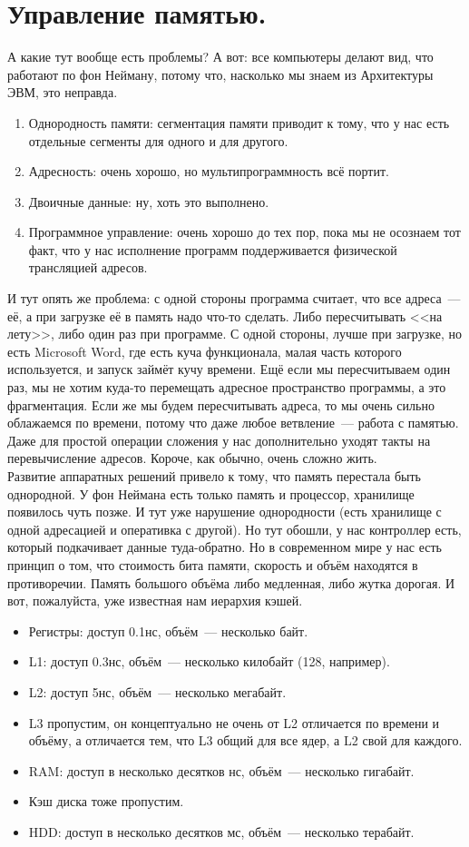\documentclass{article}
\begin{document}
    \section{Управление памятью.}
    А какие тут вообще есть проблемы? А вот: все компьютеры делают вид, что работают по фон Нейману, потому что, насколько мы знаем из Архитектуры ЭВМ, это неправда.
    \begin{enumerate}
        \item Однородность памяти: сегментация памяти приводит к тому, что у нас есть отдельные сегменты для одного и для другого.
        \item Адресность: очень хорошо, но мультипрограммность всё портит.
        \item Двоичные данные: ну, хоть это выполнено.
        \item Программное управление: очень хорошо до тех пор, пока мы не осознаем тот факт, что у нас исполнение программ поддерживается физической трансляцией адресов.
    \end{enumerate}
    И тут опять же проблема: с одной стороны программа считает, что все адреса~--- её, а при загрузке её в память надо что-то сделать. Либо пересчитывать <<на лету>>, либо один раз при программе. С одной стороны, лучше при загрузке, но есть Microsoft Word, где есть куча функционала, малая часть которого используется, и запуск займёт кучу времени. Ещё если мы пересчитываем один раз, мы не хотим куда-то перемещать адресное пространство программы, а это фрагментация. Если же мы будем пересчитывать адреса, то мы очень сильно облажаемся по времени, потому что даже любое ветвление~--- работа с памятью. Даже для простой операции сложения у нас дополнительно уходят такты на перевычисление адресов. Короче, как обычно, очень сложно жить.\\
    Развитие аппаратных решений привело к тому, что память перестала быть однородной. У фон Неймана есть только память и процессор, хранилище появилось чуть позже. И тут уже нарушение однородности (есть хранилище с одной адресацией и оперативка с другой). Но тут обошли, у нас контроллер есть, который подкачивает данные туда-обратно. Но в современном мире у нас есть принцип о том, что стоимость бита памяти, скорость и объём находятся в противоречии. Память большого объёма либо медленная, либо жутка дорогая. И вот, пожалуйста, уже известная нам иерархия кэшей.
    \begin{itemize}
        \item Регистры: доступ 0.1нс, объём~--- несколько байт.
        \item L1: доступ 0.3нс, объём~--- несколько килобайт (128, например).
        \item L2: доступ 5нс, объём~--- несколько мегабайт.
        \item L3 пропустим, он концептуально не очень от L2 отличается по времени и объёму, а отличается тем, что L3 общий для все ядер, а L2 свой для каждого.
        \item RAM: доступ в несколько десятков нс, объём~--- несколько гигабайт.
        \item Кэш диска тоже пропустим.
        \item HDD: доступ в несколько десятков мс, объём~--- несколько терабайт.
    \end{itemize}
\end{document}
